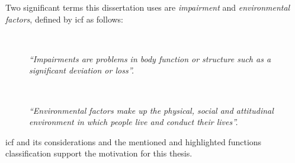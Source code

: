 Two significant terms this dissertation uses are \textit{impairment} and 
\textit{environmental factors}, defined by \ac{icf} as follows:

\begin{description}
  \item[] \hfill \\
    \begin{mdframed}[hidealllines=true,backgroundcolor=gray!20]
    \textit{``Impairments are problems in body function or structure such as a 
    significant deviation or loss''.}
    \end{mdframed} 
    
  \item[] \hfill \\
    \begin{mdframed}[hidealllines=true,backgroundcolor=gray!20]
    \textit{``Environmental factors make up the physical, social and attitudinal
    environment in which people live and conduct their lives''.}
    \end{mdframed} 
\end{description}



\ac{icf} and its considerations and the mentioned and highlighted functions
classification support the motivation for this thesis.

